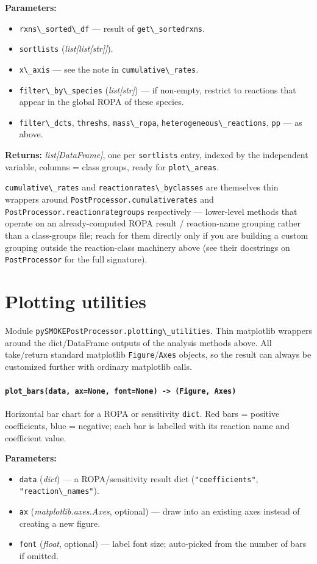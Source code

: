 \documentclass[11pt,a4paper]{report}
\newcommand{\pyfunc}[1]{\subsubsection{\texttt{#1}}}
\newcommand{\returns}{\vspace{2mm}\noindent\textbf{Returns:} }
\newenvironment{params}{\vspace{1mm}\noindent\textbf{Parameters:}\begin{itemize}[leftmargin=1.1cm,label={--},itemsep=1pt,topsep=2pt]}{\end{itemize}}
\newcommand{\pkg}[1]{\lstinline|#1|}
\begin{document}
\begin{params}
\item \pkg{rxns\_sorted\_df} --- result of \pkg{get\_sortedrxns}.
\item \pkg{sortlists} (\textit{list[list[str]]}).
\item \pkg{x\_axis} --- see the note in \pkg{cumulative\_rates}.
\item \pkg{filter\_by\_species} (\textit{list[str]}) --- if non-empty,
  restrict to reactions that appear in the global ROPA of these species.
\item \pkg{filter\_dcts}, \pkg{threshs}, \pkg{mass\_ropa},
  \pkg{heterogeneous\_reactions}, \pkg{pp} --- as above.
\end{params}
\returns \textit{list[DataFrame]}, one per \pkg{sortlists} entry, indexed by
the independent variable, columns = class groups, ready for
\pkg{plot\_areas}.

\pkg{cumulative\_rates} and \pkg{reactionrates\_byclasses} are themselves
thin wrappers around \pkg{PostProcessor.cumulativerates} and
\pkg{PostProcessor.reactionrategroups} respectively --- lower-level methods
that operate on an already-computed ROPA result / reaction-name grouping
rather than a class-groups file; reach for them directly only if you are
building a custom grouping outside the reaction-class machinery above (see
their docstrings on \pkg{PostProcessor} for the full signature).

\chapter{Plotting utilities}
\label{ch:plotting}

Module \pkg{pySMOKEPostProcessor.plotting\_utilities}. Thin matplotlib
wrappers around the dict/DataFrame outputs of the analysis methods above.
All take/return standard matplotlib \pkg{Figure}/\pkg{Axes} objects, so the
result can always be customized further with ordinary matplotlib calls.

\pyfunc{plot\_bars(data, ax=None, font=None) -> (Figure, Axes)}

Horizontal bar chart for a ROPA or sensitivity \pkg{dict}. Red bars =
positive coefficients, blue = negative; each bar is labelled with its
reaction name and coefficient value.

\begin{params}
\item \pkg{data} (\textit{dict}) --- a ROPA/sensitivity result dict
  (\pkg{"coefficients"}, \pkg{"reaction\_names"}).
\item \pkg{ax} (\textit{matplotlib.axes.Axes}, optional) --- draw into an
  existing axes instead of creating a new figure.
\item \pkg{font} (\textit{float}, optional) --- label font size; auto-picked
  from the number of bars if omitted.
\end{params}
\end{document}
